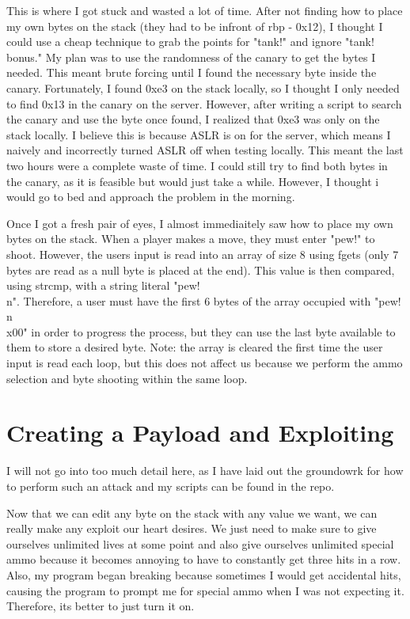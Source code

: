 \documentclass{article}
\begin{document}
This is where I got stuck and wasted a lot of time. After not finding how to place my own bytes on the stack (they had to be infront of rbp - 0x12), I thought I 
could use a cheap technique to grab the points for "tank!" and ignore "tank! bonus." My plan was to use the randomness of the canary to get the bytes I needed. This meant 
brute forcing until I found the necessary byte inside the canary. Fortunately, I found 0xe3 on the stack locally, so I thought I only needed to find 0x13 in the canary on the server. 
However, after writing a script to search the canary and use the byte once found, I realized that 0xe3 was only on the stack locally. I believe this is because ASLR is on for the server, which 
means I naively and incorrectly turned ASLR off when testing locally. This meant the last two hours were a complete waste of time. I could still try to find both bytes in the canary, 
as it is feasible but would just take a while. However, I thought i would go to bed and approach the problem in the morning. \newline

Once I got a fresh pair of eyes, I almost immediaitely saw how to place my own bytes on the stack. When a player makes a move, they must enter "pew!" to shoot. However, the users input 
is read into an array of size 8 using fgets (only 7 bytes are read as a null byte is placed at the end). This value is then compared, using strcmp, with a string literal "pew!\\n".
Therefore, a user must have the first 6 bytes of the array occupied with "pew!\\n\\x00" in order to progress the process, but they can use the last byte available to them to store a desired byte. Note: 
the array is cleared the first time the user input is read each loop, but this does not affect us because we perform the ammo selection and byte shooting within the same loop. \newline

\section{Creating a Payload and Exploiting}
I will not go into too much detail here, as I have laid out the groundowrk for how to perform such an attack and my scripts can be found in the repo. \newline

Now that we can edit any byte on the stack with any value we want, we can really make any exploit our heart desires. We just need to make sure to give ourselves unlimited lives at 
some point and also give ourselves unlimited special ammo because it becomes annoying to have to constantly get three hits in a row. Also, my program began breaking 
because sometimes I would get accidental hits, causing the program to prompt me for special ammo when I was not expecting it. Therefore, its better to just turn it on.
\end{document}
